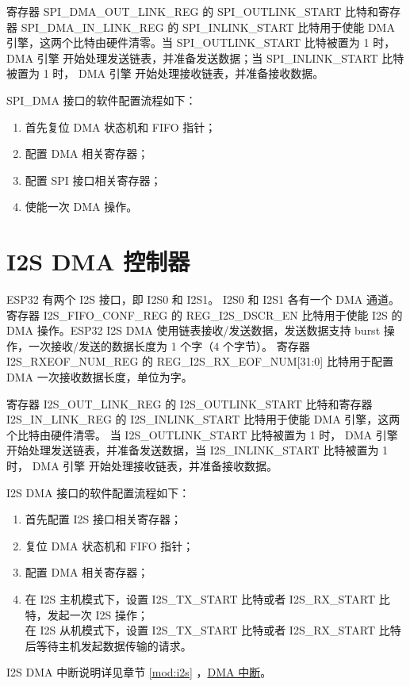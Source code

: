 \documentclass[main\_\_CN.tex]{subfiles}
\begin{document}
寄存器 SPI\_DMA\_OUT\_LINK\_REG 的 SPI\_OUTLINK\_START 比特和寄存器 SPI\_DMA\_IN\_LINK\_REG 的 SPI\_INLINK\_START 比特用于使能 DMA 引擎，这两个比特由硬件清零。当 SPI\_OUTLINK\_START 比特被置为 1 时，DMA 引擎 开始处理发送链表，并准备发送数据；当 SPI\_INLINK\_START 比特被置为 1 时， DMA 引擎 开始处理接收链表，并准备接收数据。

SPI\_DMA 接口的软件配置流程如下：
\begin{enumerate}
    \item 首先复位 DMA 状态机和 FIFO 指针；
\item 配置 DMA 相关寄存器；
\item 配置 SPI 接口相关寄存器；
\item 使能一次 DMA 操作。
\end{enumerate}

\section{I2S DMA 控制器}\label{sec:dma-i2s-dma}

ESP32 有两个 I2S 接口，即 I2S0 和 I2S1。 I2S0 和 I2S1 各有一个 DMA 通道。寄存器 I2S\_FIFO\_CONF\_REG 的 REG\_I2S\_DSCR\_EN 比特用于使能 I2S 的 DMA 操作。ESP32 I2S DMA 使用链表接收/发送数据，发送数据支持 burst 操作，一次接收/发送的数据长度为 1 个字（4 个字节）。 寄存器 I2S\_RXEOF\_NUM\_REG 的 REG\_I2S\_RX\_EOF\_NUM[31:0] 比特用于配置 DMA 一次接收数据长度，单位为字。

寄存器 I2S\_OUT\_LINK\_REG 的 I2S\_OUTLINK\_START 比特和寄存器 I2S\_IN\_LINK\_REG 的 I2S\_INLINK\_START 比特用于使能 DMA 引擎，这两个比特由硬件清零。 当 I2S\_OUTLINK\_START 比特被置为 1 时， DMA 引擎 开始处理发送链表，并准备发送数据，当 I2S\_INLINK\_START 比特被置为 1 时， DMA 引擎 开始处理接收链表，并准备接收数据。

I2S DMA 接口的软件配置流程如下：
\begin{enumerate}
    \item 首先配置 I2S 接口相关寄存器；
   \item  复位 DMA 状态机和 FIFO 指针；
   \item 配置 DMA 相关寄存器；
   \item 在 I2S 主机模式下，设置 I2S\_TX\_START 比特或者 I2S\_RX\_START 比特，发起一次 I2S 操作；\\
   在 I2S 从机模式下，设置 I2S\_TX\_START 比特或者 I2S\_RX\_START 比特后等待主机发起数据传输的请求。
\end{enumerate}
I2S DMA 中断说明详见章节 \ref{mod:i2s} \textit{}，\hyperref[DMA Interrupts]{DMA 中断}。
\end{document}
